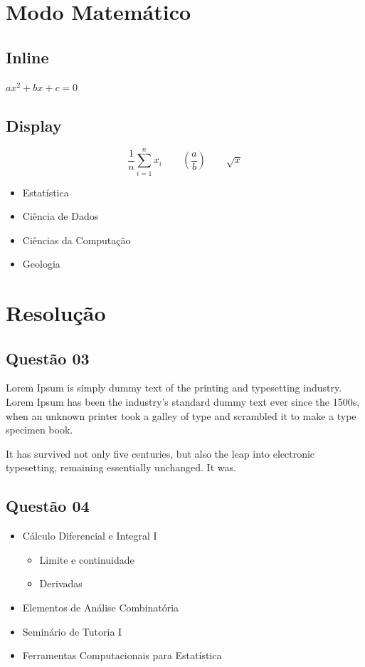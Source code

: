 \documentclass[portuguese]{article}
\begin{document}
	\section{Modo Matemático}
	\subsection{Inline}
	\(ax^2 + bx + c = 0\)
	
	\subsection{Display}
	\[
		\frac{1}{n} \sum_{i=1}^n x_i \qquad
		\left(\frac{a}{b}\right) \qquad 
		\sqrt{x}
	\]
	
	\begin{itemize}
		\item Estatística 
		\item Ciência de Dados
		\item Ciências da Computação
		\item Geologia
	\end{itemize}
	
	\vspace{0.5cm}
	
	\section{Resolução}
	
	\subsection{Questão 03}\label{subsec:ex3}
	Lorem Ipsum is simply dummy text of the printing and typesetting industry. Lorem Ipsum has been the industry's standard dummy text ever since the 1500s, when an unknown printer took a galley of type and scrambled it to make a type specimen book. 
	
	It has survived not only five centuries, but also the leap into electronic typesetting, remaining essentially unchanged. It was.
	
	\subsection{Questão 04}\label{subsec:ex4}
	\begin{itemize}
		\item Cálculo Diferencial e Integral I
			\begin{itemize}
				\item Limite e continuidade
				\item Derivadas
			\end{itemize}
		\item Elementos de Análise Combinatória
		\item Seminário de Tutoria I
		\item Ferramentas Computacionais para Estatística
	\end{itemize}
	
\end{document}
